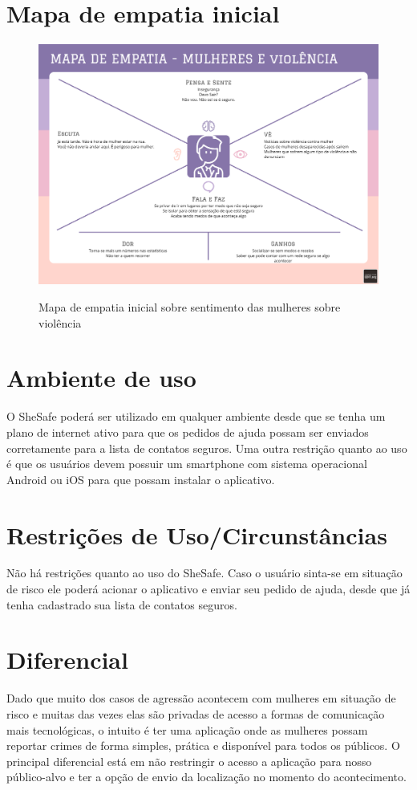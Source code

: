 \documentclass[
	12pt,				    %
	openright,			    %
	oneside,			    %
	a4paper,			    %
    sumario=tradicional,    %
	english,			    %
	brazil,				    %
	]{abntex2}              %
\begin{document}
\section{Mapa de empatia inicial}
\begin{figure}[htbp]
  \begin{center}
  \includegraphics[width=.9\linewidth]{images/mapa-empatia-inicial.png}\\
  \end{center}
  \caption[Mapa de empatia inicial]{Mapa de empatia inicial sobre sentimento das mulheres sobre violência}
  \label{fig:mapa-empatia=inicial}
\end{figure}

\section{Ambiente de uso}
O SheSafe poderá ser utilizado em qualquer ambiente desde que se tenha um plano de internet ativo para que os pedidos de ajuda possam ser enviados corretamente para a lista de contatos seguros. Uma outra restrição quanto ao uso é que os usuários devem possuir um smartphone com sistema operacional Android ou iOS para que possam instalar o aplicativo.

\section{Restrições de Uso/Circunstâncias}
Não há restrições quanto ao uso do SheSafe. Caso o usuário sinta-se em situação de risco ele poderá acionar o aplicativo e enviar seu pedido de ajuda, desde que já tenha cadastrado sua lista de contatos seguros.

\section{Diferencial}
Dado que muito dos casos de agressão acontecem com mulheres em situação de risco e muitas das vezes elas são privadas de acesso a formas de comunicação mais tecnológicas, o intuito é ter uma aplicação onde as mulheres possam reportar crimes de forma simples, prática e disponível para todos os públicos. O principal diferencial está em não restringir o acesso a aplicação para nosso público-alvo e ter a opção de envio da localização no momento do acontecimento.
\end{document}
